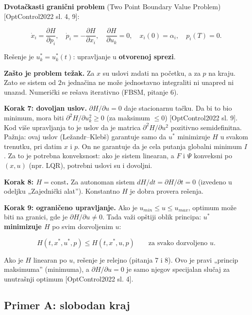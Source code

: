 \documentclass[11pt,a4paper,parskip=half,headsepline,numbers=noenddot]{scrartcl}
\DeclareRobustCommand{\izvor}[1]{{\small\color{izvorC}[#1]}}
\begin{document}
\begin{kljucna}
\textbf{Dvotačkasti granični problem} (Two Point Boundary Value Problem) \izvor{OptControl2022 sl. 4, 9}:

\[\dot x_i = \frac{\partial H}{\partial p_i}, \quad \dot p_i = -\frac{\partial H}{\partial x_i}, \quad \frac{\partial H}{\partial u_k} = 0, \quad x_i(0) = \alpha_i, \quad p_i(T) = 0 .\]

Rešenje je \(u_k^* = u_k^*(t)\): upravljanje u \textbf{otvorenoj sprezi}.
\end{kljucna}

\textbf{Zašto je problem težak.} Za \(x\) su uslovi zadati na početku, a za \(p\) na kraju. Zato se sistem od \(2n\) jednačina ne može jednostavno integraliti ni unapred ni unazad. Numerički se rešava iterativno (FBSM, pitanje 6).

\textbf{Korak 7: dovoljan uslov.} \(\partial H/\partial u = 0\) daje stacionarnu tačku. Da bi to bio minimum, mora biti \(\partial^2 H/\partial u_k^2 \ge 0\) (za maksimum \(\le 0\)) \izvor{OptControl2022 sl. 9}. Kod više upravljanja to je uslov da je matrica \(\partial^2 H/\partial u^2\) pozitivno semidefinitna. Pažnja: ovaj uslov (Ležandr--Klebš) garantuje samo da \(u^*\) minimizuje \(H\) u svakom trenutku, pri datim \(x\) i \(p\). On ne garantuje da je cela putanja globalni minimum \(I\). Za to je potrebna konveksnost: ako je sistem linearan, a \(F\) i \(\Psi\) konveksni po \((x, u)\) (npr. LQR), potrebni uslovi su i dovoljni.

\textbf{Korak 8: \(H = \text{const}\).} Za autonoman sistem \(dH/dt = \partial H/\partial t = 0\) (izvedeno u odeljku „Zajednički alat''). Konstantno \(H\) je dobra provera rešenja.

\textbf{Korak 9: ograničeno upravljanje.} Ako je \(u_{min} \le u \le u_{max}\), optimum može biti na granici, gde je \(\partial H/\partial u \ne 0\). Tada važi opštiji oblik principa: \(u^*\) \textbf{minimizuje \(H\)} po svim dozvoljenim \(u\):

\[H(t, x^*, u^*, p) \le H(t, x^*, u, p) \qquad \text{za svako dozvoljeno } u .\]

Ako je \(H\) linearan po \(u\), rešenje je relejno (pitanja 7 i 8). Ovo je pravi „princip maksimuma'' (minimuma), a \(\partial H/\partial u = 0\) je samo njegov specijalan slučaj za unutrašnji optimum \izvor{OptControl2022 sl. 4}.

\subsection{Primer A: slobodan kraj}
\end{document}

